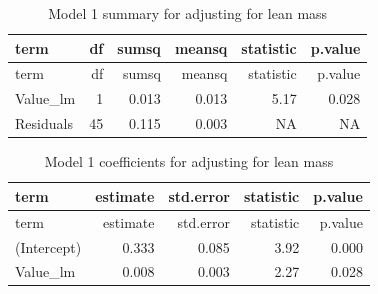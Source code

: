 \documentclass[]{article}
\newenvironment{Shaded}{\begin{snugshade}}{\end{snugshade}}
\newcommand{\CommentTok}[1]{\textcolor[rgb]{0.56,0.35,0.01}{\textit{#1}}}
\newcommand{\DataTypeTok}[1]{\textcolor[rgb]{0.13,0.29,0.53}{#1}}
\newcommand{\FloatTok}[1]{\textcolor[rgb]{0.00,0.00,0.81}{#1}}
\newcommand{\KeywordTok}[1]{\textcolor[rgb]{0.13,0.29,0.53}{\textbf{#1}}}
\newcommand{\NormalTok}[1]{#1}
\newcommand{\OperatorTok}[1]{\textcolor[rgb]{0.81,0.36,0.00}{\textbf{#1}}}
\newcommand{\StringTok}[1]{\textcolor[rgb]{0.31,0.60,0.02}{#1}}
\begin{document}
\begin{Shaded}
\end{Shaded}

\begin{longtable}[]{@{}lrrrrr@{}}
\caption{Model 1 summary for adjusting for lean mass}\tabularnewline
\toprule
term & df & sumsq & meansq & statistic & p.value\tabularnewline
\midrule
\endfirsthead
\toprule
term & df & sumsq & meansq & statistic & p.value\tabularnewline
\midrule
\endhead
Value\_lm & 1 & 0.013 & 0.013 & 5.17 & 0.028\tabularnewline
Residuals & 45 & 0.115 & 0.003 & NA & NA\tabularnewline
\bottomrule
\end{longtable}

\begin{Shaded}
\end{Shaded}

\begin{longtable}[]{@{}lrrrr@{}}
\caption{Model 1 coefficients for adjusting for lean
mass}\tabularnewline
\toprule
term & estimate & std.error & statistic & p.value\tabularnewline
\midrule
\endfirsthead
\toprule
term & estimate & std.error & statistic & p.value\tabularnewline
\midrule
\endhead
(Intercept) & 0.333 & 0.085 & 3.92 & 0.000\tabularnewline
Value\_lm & 0.008 & 0.003 & 2.27 & 0.028\tabularnewline
\bottomrule
\end{longtable}
\end{document}
